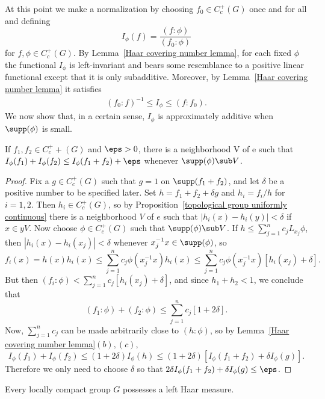 At this point we make a normalization by choosing $f_0\in C_c^+(G)$ once and for all and defining
\[I_\phi(f)=\frac{(f:\phi)}{(f_0:\phi)}\]
for $f,\phi\in C_c^+(G)$. By Lemma~\ref{Haar covering number lemma}, for each fixed $\phi$ the functional $I_\phi$ is left-invariant and bears some resemblance to a positive linear functional except that it is only subadditive. Moreover, by Lemma~\ref{Haar covering number lemma} it satisfies
\begin{align}\label{Haar functional bound}
(f_0:f)^{-1}\leq I_\phi\leq(f:f_0).
\end{align}
We now show that, in a certain sense, $I_\phi$ is approximately additive when $\supp(\phi)$ is small.
\begin{lemma}\label{Haar functional lemma}
If $f_1,f_2\in C_c^++(G)$ and $\eps>0$, there is a neighborhood V of e such that $I_\phi(f_1)+I_\phi(f_2)\leq I_\phi(f_1+f_2)+\eps$ whenever $\supp(\phi)\sub V$.
\end{lemma}
\begin{proof}
Fix a $g\in C_c^+(G)$ such that $g=1$ on $\supp(f_1+f_2)$, and let $\delta$ be a positive number to be specified later. Set $h=f_1+f_2+\delta g$ and $h_i=f_i/h$ for $i=1,2$. Then $h_i\in C_c^+(G)$, so by Proposition~\ref{topological group uniformly continuous} there is a neighborhood $V$ of $e$ such that $|h_i(x)-h_i(y)|<\delta$ if $x\in yV$. Now choose $\phi\in C_c^+(G)$ such that $\supp(\phi)\sub V$. If $h\leq\sum_{j=1}^{n}c_jL_{x_j}\phi$, then $|h_i(x)-h_i(x_j)|<\delta$ whenever $x_j^{-1}x\in\supp(\phi)$, so
\[f_i(x)=h(x)h_i(x)\leq\sum_{j=1}^{n}c_j\phi(x_j^{-1}x)h_i(x)\leq\sum_{j=1}^{n}c_j\phi(x_j^{-1}x)[h_i(x_j)+\delta].\]
But then $(f_i:\phi)<\sum_{j=1}^{n}c_j[h_i(x_j)+\delta]$, and since $h_1+h_2<1$, we conclude that
\[(f_1:\phi)+(f_2:\phi)\leq\sum_{j=1}^{n}c_j[1+2\delta].\]
Now, $\sum_{j=1}^{n}c_j$ can be made arbitrarily close to $(h:\phi)$, so by Lemma~\ref{Haar covering number lemma}$(b),(c)$,
\[I_\phi(f_1)+I_\phi(f_2)\leq (1+2\delta)I_\phi(h)\leq(1+2\delta)[I_\phi(f_1+f_2)+\delta I_\phi(g)].\]
Therefore we only need to choose $\delta$ so that $2\delta I_\phi(f_1+f_2)+\delta I_\phi(g)\leq\eps$.
\end{proof}
\begin{theorem}
Every locally compact group $G$ possesses a left Haar measure.
\end{theorem}
